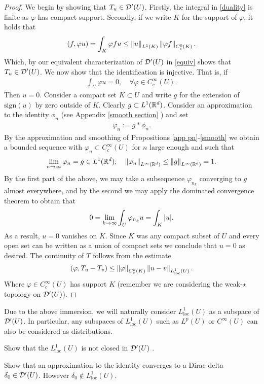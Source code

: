 \documentclass[
    a4paper,
    DIV=14,
    abstract=true,
    numbers=noenddot
]{scrartcl}
\begin{document}
\begin{proof}
	We begin by showing that $T_u \in \mathcal{D} '(U)$. Firstly, the integral in \eqref{duality} is finite as $\varphi$ has compact support. Secondly, if we write $K$ for the support of  $\varphi$,   it holds that
	\begin{align*}
		(f,\varphi u)= \int_{K}\varphi f u \leq \left\lVert u \right\rVert_{L^1(K)} \left\lVert \varphi f \right\rVert_{C^0_c(K)} .
	\end{align*}
	Which, by our equivalent characterization of $\mathcal{D}'(U)$  in \eqref{equiv} shows that $T_u \in  \mathcal{D}'(U)$. We now show that the identification is injective.  That is, if
	\begin{align*}
		\int_{U}\varphi u=0 , \quad\forall \varphi \in C_c^\infty(U) .
	\end{align*}
	Then $u=0$. Consider a compact set $K \subset U$ and write  $g$ for the extension of $\mathrm{sign}(u) $ by zero outside of  $K$. Clearly $g \subset L^1(\mathbb{R}^d)$. Consider an approximation to the identity $\phi_n $ (see Appendix \ref{smooth section} ) and set
	\begin{align*}
		\varphi_n :=  g*\phi_n.
	\end{align*}
	By the approximation and smoothing of Propositions \ref{app pn}-\ref{smooth} we obtain a bounded sequence with $\varphi_n \subset C_c^\infty(U)$ for $n$ large enough and such that
	\begin{align*}
		\lim_{n \to \infty}\varphi_n =g \in L^1(\mathbb{R}^d) ; \quad \left\lVert \varphi_n \right\rVert_{L^\infty(\mathbb{R}^d)} \leq \left\lVert g \right\rVert_{L^\infty(\mathbb{R}^d)}=1.
	\end{align*}
	By the first part of the above, we may take a subsequence $\varphi_{n_k}$ converging to $g$ almost everywhere, and by the second we may apply the dominated convergence theorem to obtain that
	\begin{align*}
		0= \lim_{k \to \infty}\int_{U}\varphi_{n_k} u=\int_{K}{\left| u \right|}.
	\end{align*}
	As a result, $u=0$ vanishes on  $K$. Since $K$ was any compact subset of $U$  and every open set can be written as a union of compact sets we conclude that $u=0$ as desired.
	The continuity of  $T$ follows from the estimate
	\begin{align*}
		(\varphi,T_{u} -T_v)\leq \left\lVert \varphi \right\rVert_{C_c^k(K)}\left\lVert u-v \right\rVert_{L^1_{\mathrm{loc}}(U)}.
	\end{align*}
	Where $\varphi \in C_c^\infty(U)$ has support $K$ (remember we are considering the weak-$\star$ topology on $\mathcal{D}'(U)$).
\end{proof}
Due to the above immersion, we will naturally consider $L^1_{\mathrm{loc}}(U)$ as a subspace of $\mathcal{D}'(U)$.    In particular, any subspaces of $L^1_{\mathrm{loc} }(U)$ such as $L^p(U)$ or  $C^\infty(U)$ can also be considered as distributions. \begin{exercise}
	Show that the $L^1_{\mathrm{loc}}(U)$ is not closed in $\mathcal{D}'(U)$  .\end{exercise}
\begin{hint}
	Show that an approximation to the identity converges to a Dirac delta $ \delta _0 \in \mathcal{D}'(U)$. However $\delta _0 \not\in L^1_{\mathrm{loc}}(U) $.
\end{hint}
\end{document}
